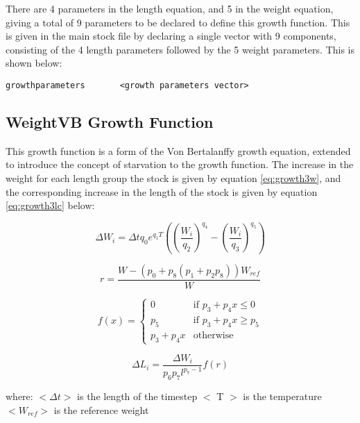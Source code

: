 \documentclass[]{book}
\begin{document}
There are 4 parameters in the length equation, and 5 in the weight
equation, giving a total of 9 parameters to be declared to define this
growth function. This is given in the main stock file by declaring a
single vector with 9 components, consisting of the 4 length parameters
followed by the 5 weight parameters. This is shown below:

\begin{verbatim}
growthparameters       <growth parameters vector>
\end{verbatim}

\hypertarget{subsec:growth3}{%
\subsection{WeightVB Growth Function}\label{subsec:growth3}}

This growth function is a form of the Von Bertalanffy growth equation,
extended to introduce the concept of starvation to the growth function.
The increase in the weight for each length group the stock is given by
equation \eqref{eq:growth3w}, and the corresponding increase in the length
of the stock is given by
equation \eqref{eq:growth3lc} below:

\begin{equation}
\label{eq:growth3w}
\Delta W_{i} = \Delta t q_{0} e^{q_{1} T} \left( \left( \frac{W_{i}}{q_{2}} \right)^{q_{4}} - \left( \frac{W_{i}}{q_{3}} \right)^{q_{5}} \right)\end{equation}

\begin{equation}
\label{eq:growth3la}
r = \frac{W - \left( p_{0} + p_{8} \left( p_{1} + p_{2}p_{8} \right) \right) W_{ref}}{W}\end{equation}

\begin{equation}
\label{eq:growth3lb}
f(x) =
\begin{cases}
0 & \textrm{if $p_{3} + p_{4}x \leq 0$} \\
p_{5} & \textrm{if $p_{3} + p_{4}x \geq p_{5}$} \\
p_{3} + p_{4}x & \textrm{otherwise}
\end{cases}\end{equation}

\begin{equation}
\label{eq:growth3lc}
\Delta L_{i} = \frac{\Delta W_{i}} {p_{6} p_{7} l^{p_{7} - 1}} f(r)\end{equation}

where: \(<\Delta t>\) is the length of the timestep \(<\) T \(>\) is the
temperature \(<W_{ref}>\) is the reference weight
\end{document}
